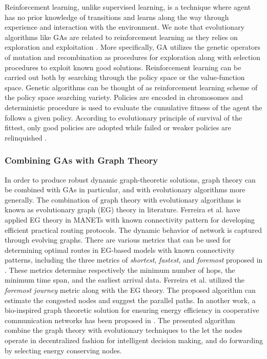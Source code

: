 \documentclass[journal]{IEEEtran}
\begin{document}
Reinforcement learning, unlike supervised learning, is a technique where agent has no prior knowledge of transitions and learns along the way through experience and interaction with the environment. We note that evolutionary algorithms like GAs are related to reinforcement learning as they relies on exploration and exploitation \cite{vcrepinvsek2013exploration}. More specifically, GA utilizes the genetic operators of mutation and recombination as procedures for exploration along with selection procedures to exploit known good solutions. Reinforcement learning can be carried out both by searching through the policy space or the value-function space. Genetic algorithms can be thought of as reinforcement learning scheme of the policy space searching variety. Policies are encoded in chromosomes and deterministic procedure is used to evaluate the cumulative fitness of the agent the follows a given policy. According to evolutionary principle of survival of the fittest, only good policies are adopted while  failed or weaker policies are relinquished \cite{moriarty1999evolutionary}. 



\vspace{2mm}
\subsubsection{Combining GAs with Graph Theory}

In order to produce robust dynamic graph-theoretic solutions, graph theory can be combined with GAs in particular, and with evolutionary algorithms more generally. The combination of graph theory with evolutionary algorithms is known as evolutionary graph (EG) theory in literature. Ferreira et al. \cite{ferreira2010performance} have applied EG theory in MANETs with known connectivity pattern for developing efficient practical routing protocols. The dynamic behavior of network is captured through evolving graphs. 
There are various metrics that can be used for determining optimal routes in EG-based models with known connectivity patterns, including the three metrics of \emph{shortest}, \emph{fastest}, and \emph{foremost} proposed in \cite{xuan2003computing}. These metrics determine respectively the minimum number of hops, the minimum time span, and the earliest arrival data. Ferreira et al. \cite{ferreira2010performance} utilized the \textit{foremost journey} metric along with the EG theory. The proposed algorithm can estimate the congested nodes and suggest the parallel paths. In another work, a bio-inspired graph theoretic solution for ensuring energy efficiency in cooperative communication networks has been proposed in \cite{DBLP:journals/corr/GajdukUBK14}. The presented algorithm combine the graph theory with evolutionary techniques to the let the nodes operate in decentralized fashion for intelligent decision making, and do forwarding by selecting energy conserving nodes.
\end{document}

